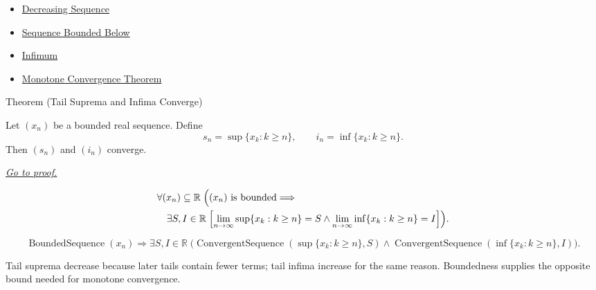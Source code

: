 \begin{remark*}[Dependencies]\hfill
\begin{itemize}
  \item \hyperref[def:decreasing-sequence]{Decreasing Sequence}
  \item \hyperref[def:sequence-bounded-below]{Sequence Bounded Below}
  \item \hyperref[def:infimum]{Infimum}
  \item \hyperref[thm:monotone-convergence-theorem]{Monotone Convergence Theorem}
\end{itemize}
\end{remark*}


\begin{theorembox}{Theorem (Tail Suprema and Infima Converge)}
\begin{theorem}
\label{thm:tail-suprema-and-infima-converge}
Let $(x_n)$ be a bounded real sequence. Define
\[
  s_n=\sup\{x_k:k\ge n\},
  \qquad
  i_n=\inf\{x_k:k\ge n\}.
\]
Then $(s_n)$ and $(i_n)$ converge.

\smallskip
\noindent
\hyperref[prf:tail-suprema-and-infima-converge]{\textit{Go to proof.}}
\end{theorem}
\end{theorembox}

\begin{remark*}
\[
\begin{aligned}
&\forall (x_n)\subseteq\mathbb{R}\;
\Bigl(
  (x_n)\text{ is bounded}
  \Longrightarrow\\
&\quad
  \exists S,I\in\mathbb{R}\;
  \Bigl[
    \lim_{n\to\infty}\sup\{x_k:k\ge n\}=S
    \land
    \lim_{n\to\infty}\inf\{x_k:k\ge n\}=I
  \Bigr]
\Bigr).
\end{aligned}
\]
\end{remark*}

\begin{remark*}
\[
\operatorname{BoundedSequence}(x_n)
\Longrightarrow
\exists S,I\in\mathbb{R}\;
\bigl(
  \operatorname{ConvergentSequence}(\sup\{x_k:k\ge n\},S)
  \land
  \operatorname{ConvergentSequence}(\inf\{x_k:k\ge n\},I)
\bigr).
\]
\end{remark*}

\begin{remark*}[Interpretation]
Tail suprema decrease because later tails contain fewer terms; tail infima
increase for the same reason. Boundedness supplies the opposite bound needed
for monotone convergence.
\end{remark*}

